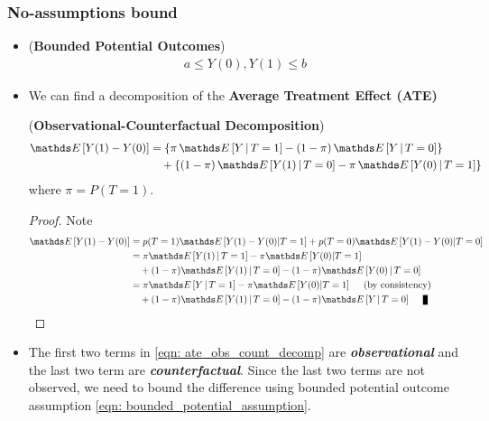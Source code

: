 \documentclass[11pt]{article}
\begin{document}
\subsubsection{No-assumptions bound}
\begin{itemize}
\item \begin{assumption} (\textbf{Bounded Potential Outcomes}) \citep{neal2020introduction}\\
\begin{align}
a \le Y(0), Y(1) \le b \label{eqn: bounded_potential_assumption}
\end{align}
\end{assumption}

\item We can find a decomposition of the \textbf{Average Treatment Effect (ATE)}
\begin{proposition} (\textbf{Observational-Counterfactual Decomposition})  \citep{neal2020introduction}\\
\begin{align}
\E{}{Y(1) - Y(0)} &= \set{\pi\, \E{}{Y \,|\, T = 1} - (1-\pi)\, \E{}{Y\,|\, T=0}}   \nonumber\\
&\quad +  \set{(1-\pi)\, \E{}{Y(1) \,|\, T=0 } - \pi\, \E{}{Y(0) \,|\, T=1} }  \label{eqn: ate_obs_count_decomp}
\end{align} where $\pi = P(T=1)$.
\end{proposition}
\begin{proof}
Note 
\begin{align*}
\E{}{Y(1) - Y(0)} &=p(T=1) \E{}{Y(1) - Y(0) | T=1} + p(T=0) \E{}{Y(1) - Y(0) | T=0} \\
 &= \pi \E{}{Y(1)\,| \, T=1} - \pi \E{}{Y(0) | T=1}  \nonumber \\
 &\quad +(1-\pi)\E{}{Y(1) \,|\, T=0}  -  (1-\pi)\E{}{Y(0) \,|\, T=0} \\
 &=  \pi \E{}{Y\,| \, T=1}   - \pi \E{}{Y(0) | T=1} \quad\text{ (by consistency)}  \nonumber \\
 &\quad +(1-\pi)\E{}{Y(1) \,|\, T=0}  -  (1-\pi)\E{}{Y \,|\, T=0} \qed
\end{align*} 
\end{proof}

\item The first two terms in \eqref{eqn: ate_obs_count_decomp} are \emph{\textbf{observational}} and the last two term are \emph{\textbf{counterfactual}}. Since the last two terms are not observed, we need to bound the difference using bounded potential outcome assumption \eqref{eqn: bounded_potential_assumption}.


\end{itemize}
\end{document}
